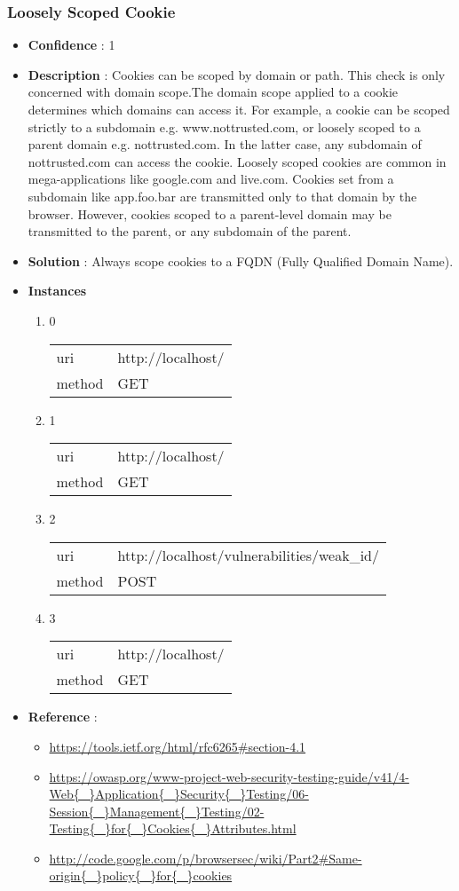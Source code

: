 \documentclass[10pt]{article}
\begin{document}
\subsubsection{Loosely Scoped Cookie}
\begin{itemize}
\item[] \textbf{Confidence} : 1
\item[] \textbf{Description} : Cookies can be scoped by domain or path. This check is only concerned with domain scope.The domain scope applied to a cookie determines which domains can access it. For example, a cookie can be scoped strictly to a subdomain e.g. www.nottrusted.com, or loosely scoped to a parent domain e.g. nottrusted.com. In the latter case, any subdomain of nottrusted.com can access the cookie. Loosely scoped cookies are common in mega-applications like google.com and live.com. Cookies set from a subdomain like app.foo.bar are transmitted only to that domain by the browser. However, cookies scoped to a parent-level domain may be transmitted to the parent, or any subdomain of the parent.
\item[] \textbf{Solution} :  Always scope cookies to a FQDN (Fully Qualified Domain Name).
\item[] \textbf{Instances}
\begin{enumerate}
\item[] 0
\begin{tabular}{| l | p{14cm}}
uri & http://localhost/ \\
method & GET \\
\end{tabular}
\item[] 1
\begin{tabular}{| l | p{14cm}}
uri & http://localhost/ \\
method & GET \\
\end{tabular}
\item[] 2
\begin{tabular}{| l | p{14cm}}
uri & http://localhost/vulnerabilities/weak{\_}id/ \\
method & POST \\
\end{tabular}
\item[] 3
\begin{tabular}{| l | p{14cm}}
uri & http://localhost/ \\
method & GET \\
\end{tabular}
\end{enumerate}
\item[] \textbf{Reference} : 
\begin{itemize}
\item \url{https://tools.ietf.org/html/rfc6265\#section-4.1}
\item \url{https://owasp.org/www-project-web-security-testing-guide/v41/4-Web{\_}Application{\_}Security{\_}Testing/06-Session{\_}Management{\_}Testing/02-Testing{\_}for{\_}Cookies{\_}Attributes.html}
\item \url{http://code.google.com/p/browsersec/wiki/Part2\#Same-origin{\_}policy{\_}for{\_}cookies}
\end{itemize}
\end{itemize}
\end{document}
